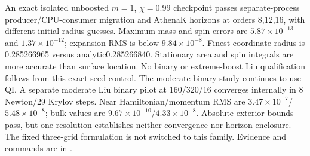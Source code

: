 \documentclass[aps,prd,preprint,notitlepage,nofootinbib]{revtex4-2}
\begin{document}
An exact isolated unboosted $m=1$, $\chi=0.99$ checkpoint passes
separate-process producer/CPU-consumer migration and AthenaK horizons at
orders 8,12,16, with different initial-radius guesses. Maximum mass and spin
errors are $5.87\times10^{-13}$ and $1.37\times10^{-12}$; expansion RMS is
below $9.84\times10^{-8}$. Finest coordinate radius is 0.285266965 versus
analytic0.285266840. Stationary area and spin integrals are more accurate
than surface location. No binary or extreme-boost Liu qualification follows
from this exact-seed control. The moderate binary study continues to use QI.
A separate moderate Liu binary pilot at 160/320/16 converges internally
in 8 Newton/29 Krylov steps. Near Hamiltonian/momentum RMS are
$3.47\times10^{-7}$/$5.48\times10^{-8}$; bulk values are
$9.67\times10^{-10}$/$4.33\times10^{-8}$. Absolute exterior bounds pass,
but one resolution establishes neither convergence nor horizon enclosure.
The fixed three-grid formulation is not switched to this family.
Evidence and commands are in .
\end{document}
